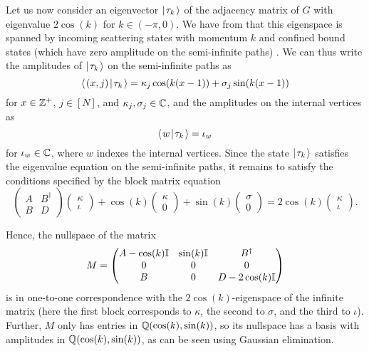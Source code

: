 \documentclass[../thesis-main/thesis-main]{subfiles}
\begin{document}
Let us now consider an eigenvector $|\mspace{2mu} \tau_k \mspace{2mu} \rangle$ of the adjacency matrix of $G$ with eigenvalue $2\cos(k)$ for $k\in (-\pi,0)$.  We have from  that this eigenspace is spanned by incoming scattering states with momentum $k$ and confined bound states (which have zero amplitude on the semi-infinite paths) . We can thus write the amplitudes of $|\mspace{2mu} \tau_k \mspace{2mu} \rangle$ on the semi-infinite paths as
\begin{equation}
  \langle\mspace{2mu} (x,j) \mspace{2mu} | \mspace{2mu} \tau_k\mspace{2mu} \rangle 
  = \kappa_j \cos(k (x-1)) + \sigma_j \sin(k (x-1))
\end{equation}
for $x \in \mathbb{Z}^+$, $j \in [N]$, and $\kappa_j,\sigma_j \in \mathbb{C}$, and the amplitudes on the internal vertices as
\begin{equation}
  \langle\mspace{2mu} w \mspace{2mu} | \mspace{2mu} \tau_k\mspace{2mu} \rangle = \iota_w
\end{equation}
for $\iota_w \in \mathbb{C}$, where $w$ indexes the internal vertices.  Since the state $|\mspace{2mu} \tau_k \mspace{2mu} \rangle$ satisfies the eigenvalue equation on the semi-infinite paths, it remains to satisfy the conditions specified by the block matrix equation
\begin{equation*}
  \begin{pmatrix} A & B^\dag\\ B & D\end{pmatrix}
	\begin{pmatrix} \kappa \\ \iota \end{pmatrix}
	+ \cos(k) \begin{pmatrix} \kappa \\ 0 \end{pmatrix}
	+ \sin(k) \begin{pmatrix} \sigma \\ 0 \end{pmatrix} 
	= 2\cos(k) \begin{pmatrix} \kappa \\ \iota \end{pmatrix}.
\end{equation*}

Hence, the nullspace of the matrix
\begin{equation}
  M= \begin{pmatrix} A -\cos(k) \mathbb{I} & \sin(k) \mathbb{I} & B^\dag\\
    0 & 0 & 0\\
    B & 0 & D-2\cos(k)\mathbb{I}\end{pmatrix}
\end{equation}
is in one-to-one correspondence with the $2\cos(k)$-eigenspace of the infinite matrix (here the first block corresponds to $\kappa$, the second to $\sigma$, and the third to $\iota$). Further, $M$ only has entries in $\mathbb{Q}(\cos(k),\sin(k))$, so its nullspace has a basis with amplitudes in $\mathbb{Q}(\cos(k),\sin(k))$, as can be seen using Gaussian elimination.
\end{document}
